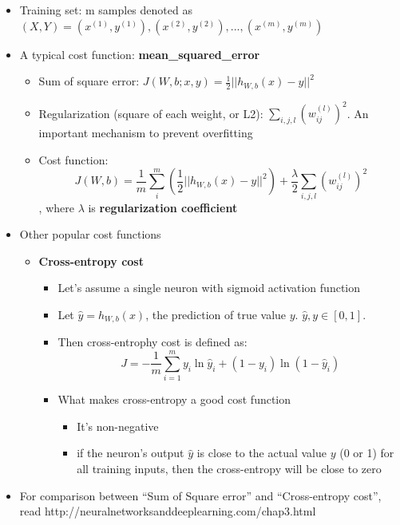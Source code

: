\documentclass[11pt]{article}
\providecommand{\tightlist}{%
      \setlength{\itemsep}{0pt}\setlength{\parskip}{0pt}}
\begin{document}
\begin{itemize}
\tightlist
\item
  Training set: m samples denoted as
  \((X,Y)={(x^{(1)}, y^{(1)}), (x^{(2)}, y^{(2)}), ..., (x^{(m)}, y^{(m)})}\)
\item
  A typical cost function: \textbf{mean\_squared\_error}

  \begin{itemize}
  \tightlist
  \item
    Sum of square error: \(J(W,b;x,y)=\frac{1}{2}||h_{W,b}(x)-y||^2\)
  \item
    Regularization (square of each weight, or L2):
    \(\sum_{i, j, l}(w_{ij}^{(l)})^2\). An important mechanism to
    prevent overfitting
  \item
    Cost function:
    \[J(W,b)=\frac{1}{m}\sum_i^m{(\frac{1}{2}||h_{W,b}(x)-y||^2)}+ \frac{\lambda}{2}\sum_{i, j, l}(w_{ij}^{(l)})^2\],
    where \(\lambda\) is \textbf{regularization coefficient}
  \end{itemize}
\item
  Other popular cost functions

  \begin{itemize}
  \tightlist
  \item
    \textbf{Cross-entropy cost}

    \begin{itemize}
    \tightlist
    \item
      Let's assume a single neuron with sigmoid activation function 
    \item
      Let \(\widehat y=h_{W,b}(x)\), the prediction of true value \(y\).
      \(\widehat y, y \in [0,1]\).
    \item
      Then cross-entrophy cost is defined as:
      \[J=-\frac{1}{m}\sum_{i=1}^m{y_i\ln{\widehat y_i}+(1-y_i)\ln{(1-\widehat y_i)}}\]
    \item
      What makes cross-entropy a good cost function

      \begin{itemize}
      \tightlist
      \item
        It's non-negative
      \item
        if the neuron's output \(\widehat y\) is close to the actual
        value \(y\) (0 or 1) for all training inputs, then the
        cross-entropy will be close to zero
      \end{itemize}
    \end{itemize}
  \end{itemize}
\item
  For comparison between ``Sum of Square error'' and ``Cross-entropy
  cost'', read http://neuralnetworksanddeeplearning.com/chap3.html
\end{itemize}
\end{document}
